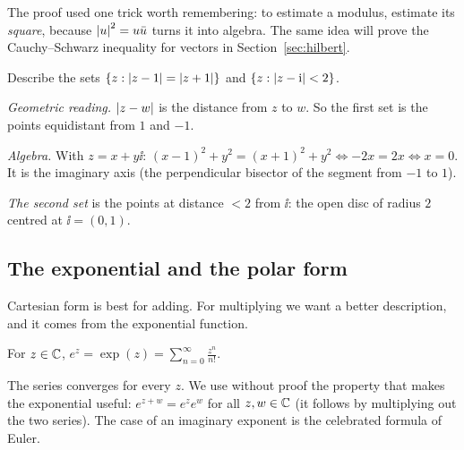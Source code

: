 \begin{remark}
  The proof used one trick worth remembering: to estimate a modulus, estimate its \emph{square}, because $\left|u\right|^2=u\bar u$ turns it into algebra. The same idea will prove the Cauchy--Schwarz inequality for vectors in Section~\ref{sec:hilbert}.
\end{remark}

\begin{example}\label{ex:locus}
  Describe the sets $\{z:\left|z-1\right|=\left|z+1\right|\}$ and $\{z:\left|z-\mathrm{i}\right|<2\}$.
\end{example}
\begin{solution}
  \begin{steps}
    \item \emph{Geometric reading.} $\left|z-w\right|$ is the distance from $z$ to $w$. So the first set is the points equidistant from $1$ and $-1$.
    \item \emph{Algebra.} With $z=x+y\ii$: $(x-1)^2+y^2=(x+1)^2+y^2\iff-2x=2x\iff x=0$. It is the imaginary axis (the perpendicular bisector of the segment from $-1$ to $1$).
    \item \emph{The second set} is the points at distance $<2$ from $\ii$: the open disc of radius $2$ centred at $\ii=(0,1)$.
  \end{steps}
\end{solution}

\subsection{The exponential and the polar form}

Cartesian form is best for adding. For multiplying we want a better description, and it comes from the exponential function.

\begin{definition}[Exponential]\label{def:exp}
  For $z\in\mathbb{C}$, $\displaystyle e^z=\exp(z)=\sum_{n=0}^{\infty}\frac{z^n}{n!}$.
\end{definition}

The series converges for every $z$. We use without proof the property that makes the exponential useful: $e^{z+w}=e^ze^w$ for all $z,w\in\mathbb{C}$ (it follows by multiplying out the two series). The case of an imaginary exponent is the celebrated formula of Euler.

